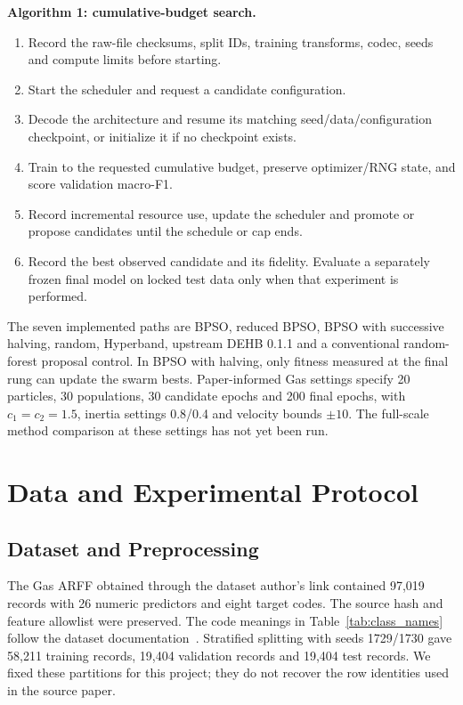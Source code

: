 \noindent\textbf{Algorithm 1: cumulative-budget search.}
\begin{enumerate}
\item Record the raw-file checksums, split IDs, training transforms, codec, seeds and compute limits before starting.
\item Start the scheduler and request a candidate configuration.
\item Decode the architecture and resume its matching seed/data/configuration checkpoint, or initialize it if no checkpoint exists.
\item Train to the requested cumulative budget, preserve optimizer/RNG state, and score validation macro-F1.
\item Record incremental resource use, update the scheduler and promote or propose candidates until the schedule or cap ends.
\item Record the best observed candidate and its fidelity. Evaluate a separately frozen final model on locked test data only when that experiment is performed.
\end{enumerate}

The seven implemented paths are BPSO, reduced BPSO, BPSO with successive halving, random, Hyperband, upstream DEHB 0.1.1 and a conventional random-forest proposal control. In BPSO with halving, only fitness measured at the final rung can update the swarm bests. Paper-informed Gas settings specify 20 particles, 30 populations, 30 candidate epochs and 200 final epochs, with $c_1=c_2=1.5$, inertia settings 0.8/0.4 and velocity bounds $\pm10$. The full-scale method comparison at these settings has not yet been run.

\section{Data and Experimental Protocol}
\subsection{Dataset and Preprocessing}
The Gas ARFF obtained through the dataset author's link contained 97,019 records with 26 numeric predictors and eight target codes. The source hash and feature allowlist were preserved. The code meanings in Table~\ref{tab:class_names} follow the dataset documentation~\cite{morris2014,hsu2014}. Stratified splitting with seeds 1729/1730 gave 58,211 training records, 19,404 validation records and 19,404 test records. We fixed these partitions for this project; they do not recover the row identities used in the source paper.

